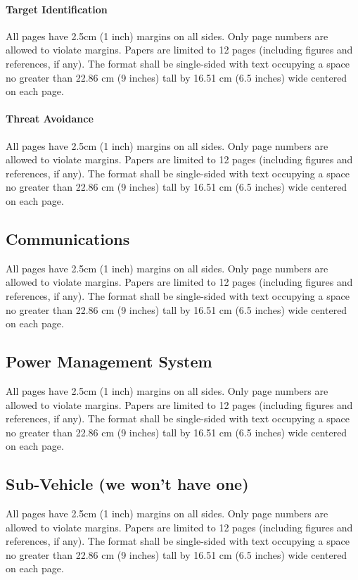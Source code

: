 \documentclass[12pt, letterpaper]{article}
\begin{document}
\paragraph{Target Identification}
All pages have 2.5cm (1 inch) margins on all sides. Only page numbers are allowed to violate margins. Papers are limited to 12 pages (including figures and references, if any). The format shall be single-sided with text occupying a space no greater than 22.86 cm (9 inches) tall by 16.51 cm (6.5 inches) wide centered on each page.

\paragraph{Threat Avoidance}
All pages have 2.5cm (1 inch) margins on all sides. Only page numbers are allowed to violate margins. Papers are limited to 12 pages (including figures and references, if any). The format shall be single-sided with text occupying a space no greater than 22.86 cm (9 inches) tall by 16.51 cm (6.5 inches) wide centered on each page.

\subsection{Communications}
All pages have 2.5cm (1 inch) margins on all sides. Only page numbers are allowed to violate margins. Papers are limited to 12 pages (including figures and references, if any). The format shall be single-sided with text occupying a space no greater than 22.86 cm (9 inches) tall by 16.51 cm (6.5 inches) wide centered on each page.

\subsection{Power Management System}
All pages have 2.5cm (1 inch) margins on all sides. Only page numbers are allowed to violate margins. Papers are limited to 12 pages (including figures and references, if any). The format shall be single-sided with text occupying a space no greater than 22.86 cm (9 inches) tall by 16.51 cm (6.5 inches) wide centered on each page.

\subsection{Sub-Vehicle (we won't have one)}
All pages have 2.5cm (1 inch) margins on all sides. Only page numbers are allowed to violate margins. Papers are limited to 12 pages (including figures and references, if any). The format shall be single-sided with text occupying a space no greater than 22.86 cm (9 inches) tall by 16.51 cm (6.5 inches) wide centered on each page.
\end{document}
